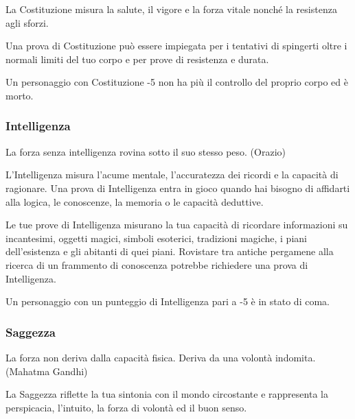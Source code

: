 \begin{multicols}{2}
La Costituzione misura la salute, il vigore e la forza vitale nonché la resistenza agli sforzi.

Una prova di Costituzione può essere impiegata per i tentativi di spingerti oltre i normali limiti del tuo corpo e per prove di resistenza e durata.

Un personaggio con Costituzione -5 non ha più il controllo del proprio corpo ed è morto.

\subsubsection{Intelligenza}\label{intelligenza}

\begin{changemargin}{0.3cm}{0.3cm}\begin{enfasi}{
La forza senza intelligenza rovina sotto il suo stesso peso. (Orazio)
}\end{enfasi}\end{changemargin}

L'Intelligenza misura l'acume mentale, l'accuratezza dei ricordi e la capacità di ragionare.
Una prova di Intelligenza entra in gioco quando hai bisogno di affidarti alla logica, le conoscenze, la memoria o le capacità deduttive.

Le tue prove di Intelligenza misurano la tua capacità di ricordare informazioni su incantesimi, oggetti magici, simboli esoterici, tradizioni magiche, i piani dell'esistenza e gli abitanti di quei piani. Rovistare tra antiche pergamene alla ricerca di un frammento di conoscenza potrebbe richiedere una prova di Intelligenza.

Un personaggio con un punteggio di Intelligenza pari a -5 è in stato di coma.

\subsubsection{Saggezza}\label{saggezza}

\begin{changemargin}{0.3cm}{0.3cm}\begin{enfasi}{
La forza non deriva dalla capacità fisica. Deriva da una volontà indomita. (Mahatma Gandhi)}\end{enfasi}\end{changemargin}

La Saggezza riflette la tua sintonia con il mondo circostante e rappresenta la perspicacia, l'intuito, la forza di volontà ed il buon senso.


\end{multicols}
